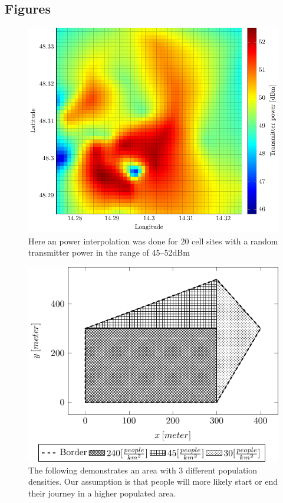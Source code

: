 \documentclass[twocolumn]{bmcart}%
\begin{document}
\begin{backmatter}

\section*{Figures}
 

\begin{figure}[h!]
	\label{fig:transmitpower}
  \caption{
      Here an power interpolation was done for 20 cell sites with a random transmitter power in the range of 45--52dBm}
      \includegraphics[width=0.9\columnwidth]{senderpower}
\end{figure}
      \begin{figure}[h!]
      \label{fig:populationgrid}
        \caption{ The following demonstrates an area with 3 different population densities. Our assumption is that people will more likely start or end their journey in a higher populated area.
            }
            \includegraphics[width=0.9\columnwidth]{populationgrid}

\end{figure}
\end{backmatter}
\end{document}
